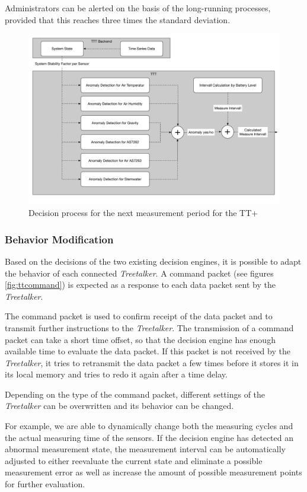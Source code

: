 Administrators can be alerted on the basis of the long-running processes, provided that this reaches three times the standard deviation.

\label{sec:implementation:treetalker:error-detection}

\begin{figure}
    \centering
    \includegraphics[width=.8\linewidth]{figures/TTT_decision_process.pdf}
    \caption{Decision process for the next measurement period for the TT+}
    \label{fig:TTT_decision_process}
\end{figure}

\subsubsection{Behavior Modification}
Based on the decisions of the two existing decision engines, it is possible to adapt the behavior of each connected \textit{Treetalker}. 
A command packet (see figures \ref{fig:ttcommand}) is expected as a response to each data packet sent by the \textit{Treetalker}. 

The command packet is used to confirm receipt of the data packet and to transmit further instructions to the \textit{Treetalker}. 
The transmission of a command packet can take a short time offset, so that the decision engine has enough available time to evaluate the data packet. 
If this packet is not received by the \textit{Treetalker}, it tries to retransmit the data packet a few times before it stores it in its local memory and tries to redo it again after a time delay. 

Depending on the type of the command packet, different settings of the \textit{Treetalker} can be overwritten and its behavior can be changed. 

For example, we are able to dynamically change both the measuring cycles and the actual measuring time of the sensors. 
If the decision engine has detected an abnormal measurement state, the measurement interval can be automatically adjusted to either reevaluate the current state and eliminate a possible measurement error as well as increase the amount of possible measurement points for further evaluation. 

